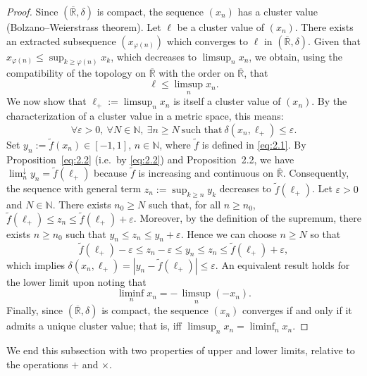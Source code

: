 \documentclass[11pt]{article}
\theoremstyle{definition}
\begin{document}
\begin{proof}
Since $(\overline{\mathbb{R}},\delta)$ is compact, the sequence $(x_n)$ has a cluster value (Bolzano--Weierstrass theorem).
Let $\ell$ be a cluster value of $(x_n)$.
There exists an extracted subsequence $(x_{\varphi(n)})$ which converges to $\ell$ in $(\overline{\mathbb{R}},\delta)$.
Given that $x_{\varphi(n)}\le \sup_{k\ge \varphi(n)} x_k$, which decreases to $\limsup_{n} x_n$, we obtain, using the compatibility of the topology on $\overline{\mathbb{R}}$ with the order on $\overline{\mathbb{R}}$, that
\[
\ell \le \limsup_{n} x_n.
\]
We now show that $\ell_+:=\limsup_{n} x_n$ is itself a cluster value of $(x_n)$.
By the characterization of a cluster value in a metric space, this means:
\[
\forall \varepsilon>0,\ \forall N\in\mathbb{N},\ \exists n\ge N\ \text{such that}\ \delta(x_n,\ell_+)\le \varepsilon.
\]
Set $y_n:=\tilde f(x_n)\in[-1,1]$, $n\in\mathbb{N}$, where $\tilde f$ is defined in \eqref{eq:2.1}.
By Proposition~\ref{eq:2.2} (i.e.\ by \eqref{eq:2.2}) and Proposition~2.2, we have $\lim_{n}^\downarrow y_n=\tilde f(\ell_+)$ because $\tilde f$ is increasing and continuous on $\overline{\mathbb{R}}$.
Consequently, the sequence with general term $z_n:=\sup_{k\ge n} y_k$ decreases to $\tilde f(\ell_+)$.
Let $\varepsilon>0$ and $N\in\mathbb{N}$.
There exists $n_0\ge N$ such that, for all $n\ge n_0$, $\tilde f(\ell_+)\le z_n\le \tilde f(\ell_+)+\varepsilon$.
Moreover, by the definition of the supremum, there exists $n\ge n_0$ such that $y_n\le z_n\le y_n+\varepsilon$.
Hence we can choose $n\ge N$ so that
\[
\tilde f(\ell_+) - \varepsilon \le z_n - \varepsilon \le y_n \le z_n \le \tilde f(\ell_+)+\varepsilon,
\]
which implies $\delta(x_n,\ell_+)=|y_n-\tilde f(\ell_+)|\le \varepsilon$.
An equivalent result holds for the lower limit upon noting that
\[
\liminf_{n} x_n= -\,\limsup_{n}(-x_n).
\]
Finally, since $(\overline{\mathbb{R}},\delta)$ is compact, the sequence $(x_n)$ converges if and only if it admits a unique cluster value; that is, iff $\limsup_{n} x_n=\liminf_{n} x_n$.
\end{proof}

We end this subsection with two properties of upper and lower limits, relative to the operations $+$ and $\times$.
\end{document}
